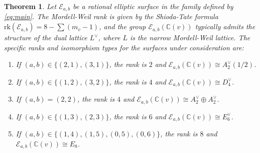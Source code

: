 \documentclass[11pt]{amsart}
\newcommand{\CC}{{\mathbb C}}
\newcommand{\Ee}{{\mathcal E}}
\newcommand{\rk}{{\text{rk}}}
\newtheorem{thm}{Theorem}[section]
\numberwithin{equation}{section}
\numberwithin{table}{section}
\newcommand\<{\langle}
\begin{document}
\begin{thm}
	\label{thm:lattice_structure}
	Let $\Ee_{a,b}$ be a rational elliptic surface in the family defined by \eqref{eq:main}. The Mordell-Weil rank is given by the Shioda-Tate formula $\rk(\Ee_{a,b}) = 8 - \sum (m_v - 1)$, and the group $\Ee_{a,b}(\CC(v))$ typically admits the structure of the dual lattice $L^\vee$, where $L$ is the narrow Mordell-Weil lattice. The specific ranks and isomorphism types for the surfaces under consideration are:
	\begin{enumerate}
		\item If $(a,b) \in \{(2,1), (3,1)\}$, the rank is $2$ and $\Ee_{a,b}(\CC(v)) \cong A_2^\vee(1/2)$.
		\item If $(a,b) \in \{(1,2), (3,2)\}$, the rank is $4$ and $\Ee_{a,b}(\CC(v)) \cong D_4^\vee$.
		\item If $(a,b) = (2,2)$, the rank is $4$ and $\Ee_{a,b}(\CC(v)) \cong A_2^\vee \oplus A_2^\vee$.
		\item If $(a,b) \in \{(1,3), (2,3)\}$, the rank is $6$ and $\Ee_{a,b}(\CC(v)) \cong E_6^\vee$.
		\item If $(a,b) \in \{(1,4), (1,5), (0,5), (0,6)\}$, the rank is $8$ and $\Ee_{a,b}(\CC(v)) \cong E_8$.
	\end{enumerate}
\end{thm}
\end{document}
